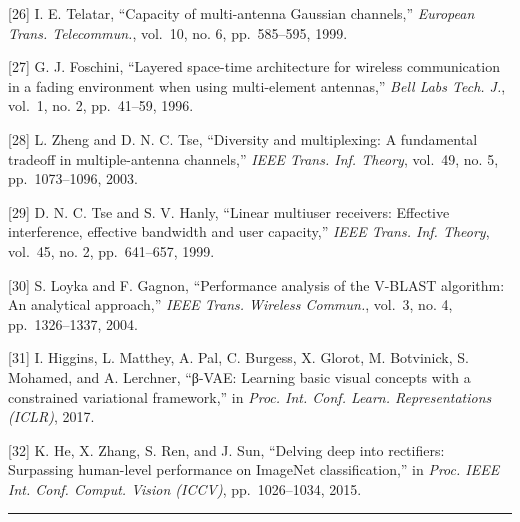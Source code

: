 {[}26{]} I. E. Telatar, ``Capacity of multi-antenna Gaussian channels,'' \emph{European Trans. Telecommun.}, vol.~10, no. 6, pp.~585--595, 1999.

{[}27{]} G. J. Foschini, ``Layered space-time architecture for wireless communication in a fading environment when using multi-element antennas,'' \emph{Bell Labs Tech. J.}, vol.~1, no. 2, pp.~41--59, 1996.

{[}28{]} L. Zheng and D. N. C. Tse, ``Diversity and multiplexing: A fundamental tradeoff in multiple-antenna channels,'' \emph{IEEE Trans. Inf. Theory}, vol.~49, no. 5, pp.~1073--1096, 2003.

{[}29{]} D. N. C. Tse and S. V. Hanly, ``Linear multiuser receivers: Effective interference, effective bandwidth and user capacity,'' \emph{IEEE Trans. Inf. Theory}, vol.~45, no. 2, pp.~641--657, 1999.

{[}30{]} S. Loyka and F. Gagnon, ``Performance analysis of the V-BLAST algorithm: An analytical approach,'' \emph{IEEE Trans. Wireless Commun.}, vol.~3, no. 4, pp.~1326--1337, 2004.

{[}31{]} I. Higgins, L. Matthey, A. Pal, C. Burgess, X. Glorot, M. Botvinick, S. Mohamed, and A. Lerchner, ``β-VAE: Learning basic visual concepts with a constrained variational framework,'' in \emph{Proc. Int. Conf. Learn. Representations (ICLR)}, 2017.

{[}32{]} K. He, X. Zhang, S. Ren, and J. Sun, ``Delving deep into rectifiers: Surpassing human-level performance on ImageNet classification,'' in \emph{Proc. IEEE Int. Conf. Comput. Vision (ICCV)}, pp.~1026--1034, 2015.



\begin{center}\rule{0.5\linewidth}{0.5pt}\end{center}

